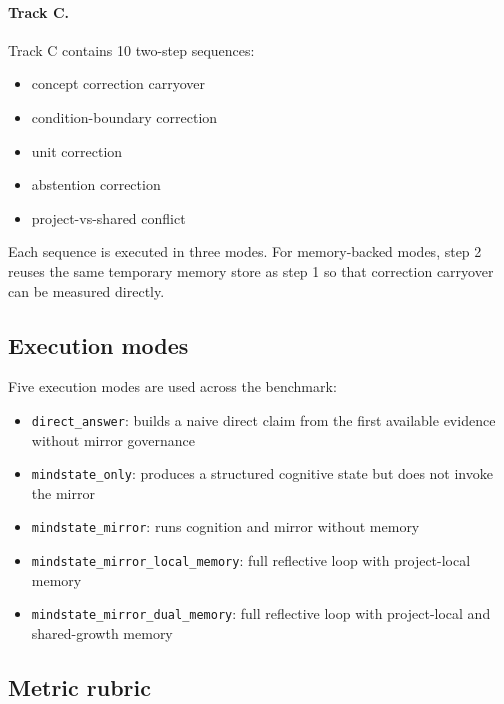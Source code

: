 \documentclass[12pt]{article}
\begin{document}
\paragraph{Track C.}
Track C contains 10 two-step sequences:
\begin{itemize}
\item concept correction carryover
\item condition-boundary correction
\item unit correction
\item abstention correction
\item project-vs-shared conflict
\end{itemize}
Each sequence is executed in three modes. For memory-backed modes, step 2 reuses the same temporary memory store as step 1 so that correction carryover can be measured directly.

\subsection{Execution modes}

Five execution modes are used across the benchmark:
\begin{itemize}
\item \texttt{direct\_answer}: builds a naive direct claim from the first available evidence without mirror governance
\item \texttt{mindstate\_only}: produces a structured cognitive state but does not invoke the mirror
\item \texttt{mindstate\_mirror}: runs cognition and mirror without memory
\item \texttt{mindstate\_mirror\_local\_memory}: full reflective loop with project-local memory
\item \texttt{mindstate\_mirror\_dual\_memory}: full reflective loop with project-local and shared-growth memory
\end{itemize}

\subsection{Metric rubric}
\end{document}
